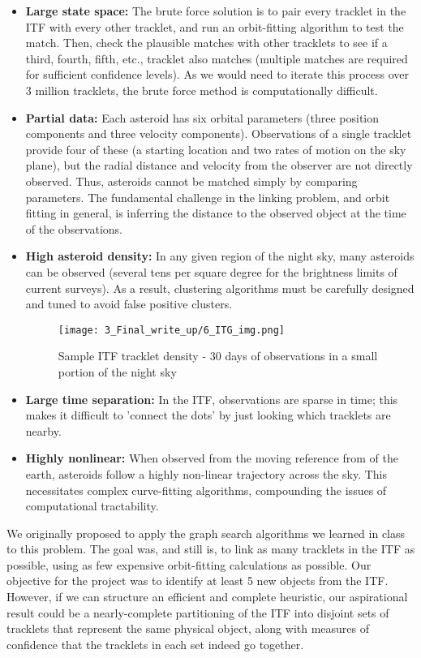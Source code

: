 \documentclass[11pt,letter]{article}
\begin{document}
\begin{itemize}
    \item \textbf{Large state space:}
    The brute force solution is to pair every tracklet in the ITF with every other tracklet, and run an orbit-fitting algorithm to test the match.  Then, check the plausible matches with other tracklets to see if a third, fourth, fifth, etc., tracklet also matches (multiple matches are required for sufficient confidence levels).  As we would need to iterate this process over 3 million tracklets, the brute force method is computationally difficult.
    \item \textbf{Partial data:}
    Each asteroid has six orbital parameters (three position components and three velocity components).  Observations of a single tracklet provide four of these (a starting location and two rates of motion on the sky plane), but the radial distance and velocity from the observer are not directly observed.   Thus, asteroids cannot be matched simply by comparing parameters.  The fundamental challenge in the linking problem, and orbit fitting in general, is inferring the distance to the observed object at the time of the observations. 
    \item \textbf{High asteroid density:}
    In any given region of the night sky, many asteroids can be observed (several tens per square degree for the brightness limits of current surveys).  As a result, clustering algorithms must be carefully designed and tuned to avoid false positive clusters.
    \begin{figure}[!hp]%
    \centering
    \texttt{[image: 3\_Final\_write\_up/6\_ITG\_img.png]}
    \caption{Sample ITF tracklet density - 30 days of observations in a small portion of the night sky}%
    \label{fig:itf_sample}%
\end{figure}
    \item \textbf{Large time separation:}
    In the ITF, observations are sparse in time; this makes it difficult to 'connect the dots' by just looking which tracklets are nearby.
    \item \textbf{Highly nonlinear:}
    When observed from the moving reference from of the earth, asteroids follow a highly non-linear trajectory across the sky.  This necessitates complex curve-fitting algorithms, compounding the issues of computational tractability.
\end{itemize}

We originally proposed to apply the graph search algorithms we  learned in class to this problem.  The goal was, and still is, to link as many tracklets in the ITF as possible, using as few expensive orbit-fitting calculations as possible.  Our objective for the project was to identify at least 5 new objects from the ITF.  However, if we can structure an efficient and complete heuristic, our aspirational result could be a nearly-complete partitioning of the ITF into disjoint sets of tracklets that represent the same physical object, along with measures of confidence that the tracklets in each set indeed go together.
\end{document}
